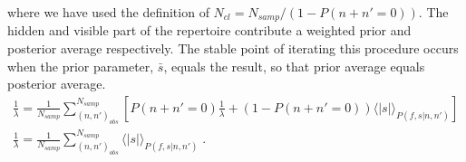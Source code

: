 \documentclass[letterpaper,english,prl,reprint,onecolumn]{revtex4-1} %
\begin{document}
where we have used the definition of $N_{cl}=N_{samp}/(1-P(n+n'=0))$. The hidden and visible part of the repertoire contribute a weighted prior and posterior average respectively. The stable point of iterating this procedure occurs when the prior parameter, $\bar{s}$, equals the result, so that prior average equals posterior average.
\begin{align}
	\frac{1}{\lambda}=\frac{1}{N_{samp}}\sum_{(n,n')_{obs}}^{N_{samp}}\left[P(n+n'=0)\frac{1}{\lambda}+(1-P(n+n'=0))\langle|s|\rangle_{P(f,s|n,n')}\right]\\
	\frac{1}{\lambda}=\frac{1}{N_{samp}}\sum_{(n,n')_{obs}}^{N_{samp}}\langle|s|\rangle_{P(f,s|n,n')}\;.
\end{align}
\end{document}

